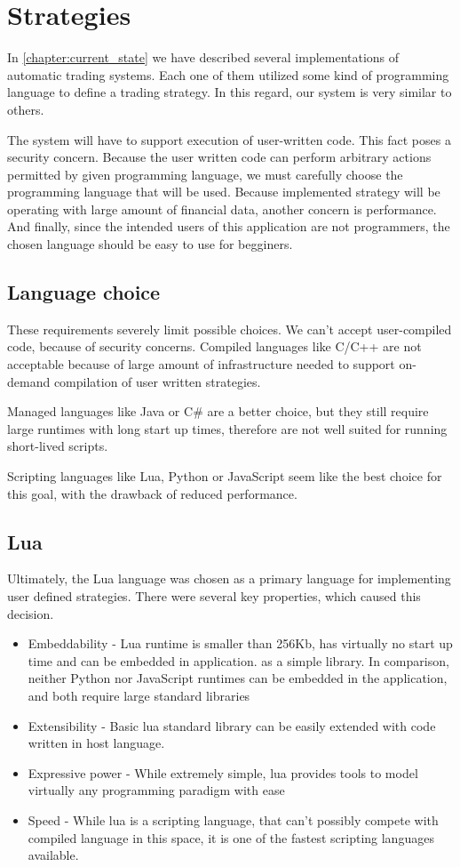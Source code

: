 \section{Strategies}
In \autoref{chapter:current_state} we have described several implementations of automatic trading systems. Each one of them
utilized some kind of programming language to define a trading strategy. In this regard, our system is very similar to others.

The system will have to support execution of user-written code. This fact poses a security concern. Because the user
written code can perform arbitrary actions permitted by given programming language, we must carefully choose the programming
language that will be used. Because implemented strategy will be operating with large amount of financial data, another
concern is performance. And finally, since the intended users of this application are not programmers, the chosen language
should be easy to use for begginers.

\subsection{Language choice}
These requirements severely limit possible choices. We can't accept user-compiled code, because of security concerns.
Compiled languages like C/C++ are not acceptable because of large amount of infrastructure needed to support
on-demand compilation of user written strategies.

Managed languages like Java or C\# are a better choice, but they still require large runtimes with long start up times, therefore
are not well suited for running short-lived scripts.

Scripting languages like Lua, Python or JavaScript seem like the best choice for this goal, with the drawback of
reduced performance.

\subsection{Lua}
Ultimately, the Lua language was chosen as a primary language for implementing user defined strategies. There were several
key properties, which caused this decision.

\begin{itemize}
    \item Embeddability - Lua runtime is smaller than 256Kb, has virtually no start up time and can be embedded in application.
    as a simple library. In comparison, neither Python nor JavaScript runtimes can be embedded in the application, and both
    require large standard libraries
    \item Extensibility - Basic lua standard library can be easily extended with code written in host language.
    \item Expressive power - While extremely simple, lua provides tools to model virtually any programming paradigm with ease
    \item Speed - While lua is a scripting language, that can't possibly compete with compiled language in this space,
    it is one of the fastest scripting languages available.
\end{itemize}

